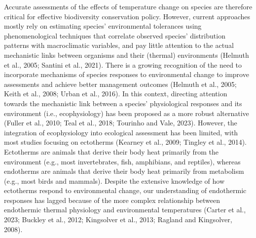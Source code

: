 \documentclass[10pt, twoside]{book} %
\begin{document}
	Accurate assessments of the effects of temperature change on species are therefore critical for effective biodiversity conservation policy. However, current approaches mostly rely on estimating species' environmental tolerances using phenomenological techniques that correlate observed species' distribution patterns with macroclimatic variables, and pay little attention to the actual mechanistic links between organisms and their (thermal) environments (Helmuth et al., 2005; Santini et al., 2021). There is a growing recognition of the need to incorporate mechanisms of species responses to environmental change to improve assessments and achieve better management outcomes (Helmuth et al., 2005; Keith et al., 2008; Urban et al., 2016). In this context, directing attention towards the mechanistic link between a species' physiological responses and its environment (i.e., ecophysiology) has been proposed as a more robust alternative (Fuller et al., 2010; Teal et al., 2018; Tourinho and Vale, 2023). However, the integration of ecophysiology into ecological assessment has been limited, with most studies focusing on ectotherms (Kearney et al., 2009; Tingley et al., 2014). Ectotherms are animals that derive their body heat primarily from the environment (e.g., most invertebrates, fish, amphibians, and reptiles), whereas endotherms are animals that derive their body heat primarily from metabolism (e.g., most birds and mammals). Despite the extensive knowledge of how ectotherms respond to environmental change, our understanding of endothermic responses has lagged because of the more complex relationship between endothermic thermal physiology and environmental temperatures (Carter et al., 2023; Buckley et al., 2012; Kingsolver et al., 2013; Ragland and Kingsolver, 2008). \\
\end{document}
